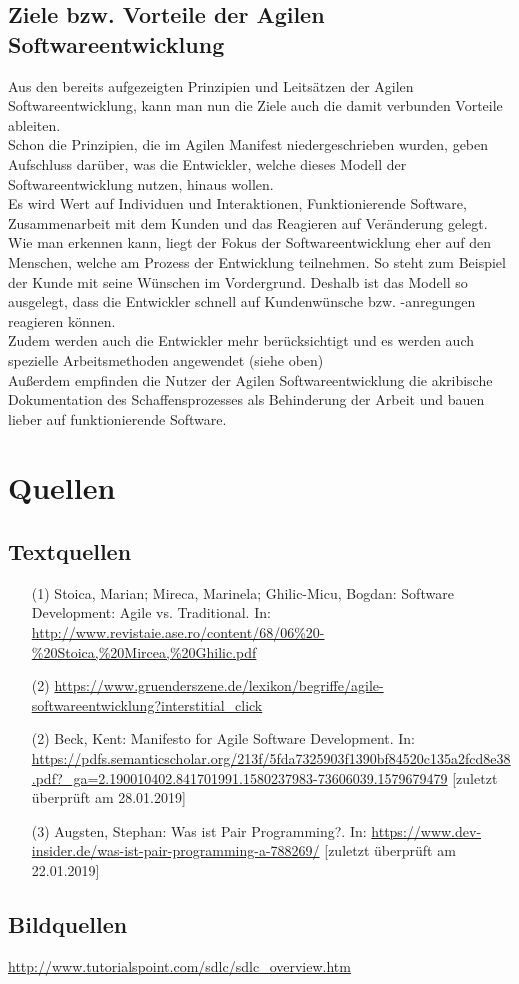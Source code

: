 \documentclass[a4paper, 10pt]{scrartcl}
\begin{document}
\subsection{Ziele bzw. Vorteile der Agilen Softwareentwicklung}
Aus den bereits aufgezeigten Prinzipien und Leitsätzen der Agilen Softwareentwicklung, kann man nun die Ziele  auch die damit verbunden Vorteile ableiten. \\
Schon die Prinzipien, die im \glqq{}Agilen Manifest\grqq{} niedergeschrieben wurden, geben Aufschluss darüber, was die Entwickler, welche dieses Modell der Softwareentwicklung nutzen, hinaus wollen.\\ Es wird Wert auf \glqq{}Individuen und Interaktionen, Funktionierende Software, Zusammenarbeit mit dem Kunden und das Reagieren auf Veränderung\grqq{} gelegt. Wie man erkennen kann, liegt der Fokus der Softwareentwicklung eher auf den Menschen, welche am Prozess der Entwicklung teilnehmen. So steht zum Beispiel der Kunde mit seine Wünschen im Vordergrund. Deshalb ist das Modell so ausgelegt, dass die Entwickler schnell auf Kundenwünsche bzw. -anregungen reagieren können.\\ Zudem werden auch die Entwickler mehr berücksichtigt und es werden auch spezielle Arbeitsmethoden angewendet (siehe oben)\\Außerdem empfinden die Nutzer der Agilen Softwareentwicklung die akribische Dokumentation des Schaffensprozesses als Behinderung der Arbeit und bauen lieber auf \glqq funktionierende Software\grqq. \\ 


\section{Quellen}
\subsection{Textquellen}
\begin{itemize}
\item[(1)] Stoica, Marian; Mireca, Marinela; Ghilic-Micu, Bogdan: Software Development: Agile vs. Traditional. In: \url{http://www.revistaie.ase.ro/content/68/06%20-%20Stoica,%20Mircea,%20Ghilic.pdf}
\item[(2)] \url{https://www.gruenderszene.de/lexikon/begriffe/agile-softwareentwicklung?interstitial_click}
\item[(2)] Beck, Kent: Manifesto for Agile Software Development. In: \url{https://pdfs.semanticscholar.org/213f/5fda7325903f1390bf84520c135a2fcd8e38.pdf?_ga=2.190010402.841701991.1580237983-73606039.1579679479} [zuletzt überprüft am 28.01.2019]
\item[(3)] Augsten, Stephan: Was ist Pair Programming?. In: \url{https://www.dev-insider.de/was-ist-pair-programming-a-788269/} [zuletzt überprüft am 22.01.2019]
\end{itemize}
\subsection{Bildquellen}
\url{http://www.tutorialspoint.com/sdlc/sdlc_overview.htm}
\end{document}
